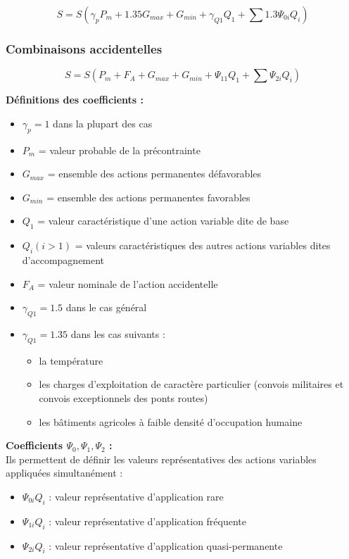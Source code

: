 \documentclass[12pt,a4paper]{article}
\begin{document}
\begin{equation}
S = S(\gamma_p P_m + 1.35 G_{max} + G_{min} + \gamma_{Q1} Q_1 + \sum 1.3 \Psi_{0i} Q_i)
\end{equation}

\subsubsection{Combinaisons accidentelles}

\begin{equation}
S = S(P_m + F_A + G_{max} + G_{min} + \Psi_{11} Q_1 + \sum \Psi_{2i} Q_i)
\end{equation}

\begin{infobox}
\textbf{Définitions des coefficients :}
\begin{itemize}
    \item $\gamma_p = 1$ dans la plupart des cas
    \item $P_m$ = valeur probable de la précontrainte
    \item $G_{max}$ = ensemble des actions permanentes défavorables
    \item $G_{min}$ = ensemble des actions permanentes favorables
    \item $Q_1$ = valeur caractéristique d'une action variable dite de base
    \item $Q_i (i>1)$ = valeurs caractéristiques des autres actions variables dites d'accompagnement
    \item $F_A$ = valeur nominale de l'action accidentelle
    \item $\gamma_{Q1} = 1.5$ dans le cas général
    \item $\gamma_{Q1} = 1.35$ dans les cas suivants :
    \begin{itemize}
        \item la température
        \item les charges d'exploitation de caractère particulier (convois militaires et convois exceptionnels des ponts routes)
        \item les bâtiments agricoles à faible densité d'occupation humaine
    \end{itemize}
\end{itemize}
\end{infobox}

\begin{infobox}
\textbf{Coefficients $\Psi_0, \Psi_1, \Psi_2$ :}\\
Ils permettent de définir les valeurs représentatives des actions variables appliquées simultanément :
\begin{itemize}
    \item $\Psi_{0i} Q_i$ : valeur représentative d'application rare
    \item $\Psi_{1i} Q_i$ : valeur représentative d'application fréquente
    \item $\Psi_{2i} Q_i$ : valeur représentative d'application quasi-permanente
\end{itemize}
\end{infobox}
\end{document}
